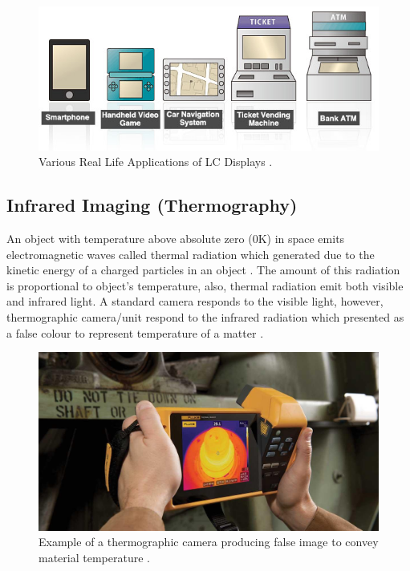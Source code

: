 \begin{figure}[!ht]
    \centering
    \includegraphics[scale = 0.6]{Figures/LCD_various app.jpg}
    \caption{Various Real Life Applications of LC Displays \cite{AnonymousHowEIZO}.}
    \label{fig:LCD var app}
\end{figure}

\subsection{Infrared Imaging (Thermography)}

An object with temperature above absolute zero (0K) in space emits electromagnetic waves called thermal radiation which generated due to the kinetic energy of a charged particles in an object \cite{Stumper2015ThermalAviation}. The amount of this radiation is proportional to object's temperature, also, thermal radiation emit both visible and infrared light. A standard camera responds to the visible light, however, thermographic camera/unit respond to the infrared radiation which presented as a false colour to represent temperature of a matter \cite{AnonymousThermographyEngineering}. \\

\begin{figure}[!ht]
    \centering
    \includegraphics[scale=0.3]{Figures/IR_example_false image.jpeg}
    \caption{Example of a thermographic camera producing false image to convey material temperature \cite{TroutInfraredPlant}.}
    \label{fig:basic IR}
\end{figure}

